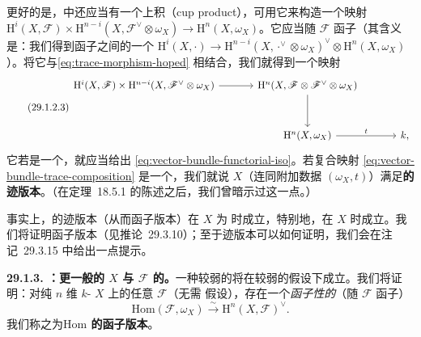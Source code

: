 更好的是，\trCohomology{}中还应当有一个上积（cup product），可用它来构造一个映射 $\mathrm{H}^i(X,\mathscr{F})\times\mathrm{H}^{n-i}(X,\mathscr{F}^{\vee}\otimes\omega_X)\to\mathrm{H}^n(X,\omega_X)$。它应当随 $\mathscr{F}$ 函子（其含义是：我们得到函子之间的一个\trNaturalTransformation{} $\mathrm{H}^i(X,\cdot)\to\mathrm{H}^{n-i}(X,\cdot^{\vee}\otimes\omega_X)^{\vee}\otimes\mathrm{H}^n(X,\omega_X)$）。将它与\trTraceMap \eqref{eq:trace-morphism-hoped} 相结合，我们就得到一个映射
\begin{equation*}\tag{29.1.2.3}\label{eq:vector-bundle-trace-composition}
\begin{tikzcd}[row sep=3.2em, column sep=3.4em]
\mathrm{H}^i(X,\mathscr{F})\times\mathrm{H}^{n-i}(X,\mathscr{F}^{\vee}\otimes\omega_X) \ar[r] & \mathrm{H}^n(X,\mathscr{F}\otimes\mathscr{F}^{\vee}\otimes\omega_X) \ar[d] \\
& \mathrm{H}^n(X,\omega_X) \ar[r, "t"] & k,
\end{tikzcd}
\end{equation*}
它若是一个\trPerfectPairing，就应当给出 \eqref{eq:vector-bundle-functorial-iso}。若复合映射 \eqref{eq:vector-bundle-trace-composition} 是一个\trPerfectPairing，我们就说 $X$（连同附加数据 $(\omega_X,t)$）满足\textbf{\trVectorBundle{}\trSerreDuality{}的迹版本}。（在\mbox{定理~18.5.1} 的陈述之后，我们曾暗示过这一点。）

事实上，\trVectorBundle{}\trSerreDuality{}的迹版本（从而函子版本）在 $X$ 为 \trCM{}时成立，特别地，在 $X$ \trSmooth{}时成立。我们将证明函子版本（见\mbox{推论~29.3.10}）；至于迹版本可以如何证明，我们会在\mbox{注记~29.3.15} 中给出一点提示。

\textbf{29.1.3. \trDesideratum{}：更一般的 $X$ 与 $\mathscr{F}$ 的\trDuality。}\quad 一种较弱的\trDuality{}将在较弱的假设下成立。我们将证明：对纯 $n$ 维\trProjective{} $k$-\trScheme{} $X$ 上的任意\trCoherentSheaf{} $\mathscr{F}$（无需 \trCM{}假设），存在一个\emph{函子性的\trIsomorphism}（随 $\mathscr{F}$ 函子）
\begin{equation*}\tag{29.1.3.1}\label{eq:hom-functorial-iso}
\boxed{\mathrm{Hom}(\mathscr{F},\omega_X)\overset{\sim}{\longrightarrow}\mathrm{H}^n(X,\mathscr{F})^{\vee}.}
\end{equation*}
我们称之为\textbf{$\mathrm{Hom}$ 的函子版本\trSerreDuality}。

